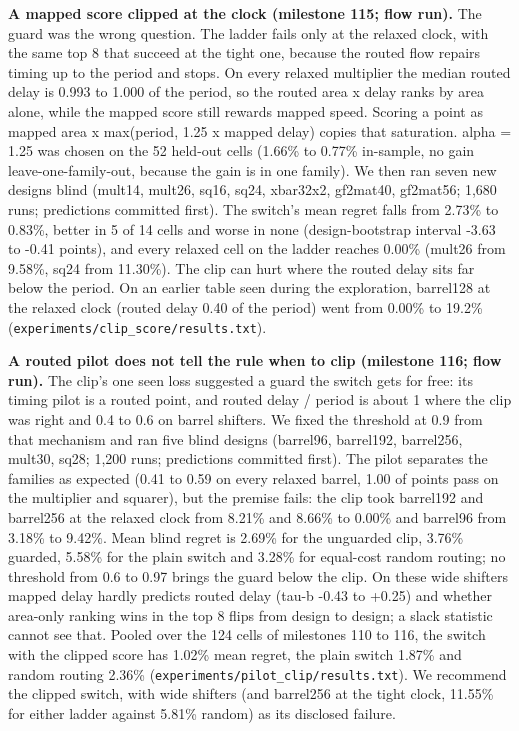 \documentclass[conference]{IEEEtran}
\begin{document}
\textbf{A mapped score clipped at the clock (milestone 115; flow run).}
The guard was the wrong question. The ladder fails only at the relaxed
clock, with the same top 8 that succeed at the tight one, because the
routed flow repairs timing up to the period and stops. On every relaxed
multiplier the median routed delay is 0.993 to 1.000 of the period, so
the routed area x delay ranks by area alone, while the mapped score
still rewards mapped speed. Scoring a point as mapped area x max(period,
1.25 x mapped delay) copies that saturation. alpha = 1.25 was chosen on
the 52 held-out cells (1.66\% to 0.77\% in-sample, no gain
leave-one-family-out, because the gain is in one family). We then ran
seven new designs blind (mult14, mult26, sq16, sq24, xbar32x2, gf2mat40,
gf2mat56; 1,680 runs; predictions committed first). The switch's mean
regret falls from 2.73\% to 0.83\%, better in 5 of 14 cells and worse in
none (design-bootstrap interval -3.63 to -0.41 points), and every
relaxed cell on the ladder reaches 0.00\% (mult26 from 9.58\%, sq24 from
11.30\%). The clip can hurt where the routed delay sits far below the
period. On an earlier table seen during the exploration, barrel128 at
the relaxed clock (routed delay 0.40 of the period) went from 0.00\% to
19.2\% (\texttt{experiments/\allowbreak{}clip\_\allowbreak{}score/\allowbreak{}results.txt}).

\textbf{A routed pilot does not tell the rule when to clip (milestone
116; flow run).} The clip's one seen loss suggested a guard the switch
gets for free: its timing pilot is a routed point, and routed delay /
period is about 1 where the clip was right and 0.4 to 0.6 on barrel
shifters. We fixed the threshold at 0.9 from that mechanism and ran five
blind designs (barrel96, barrel192, barrel256, mult30, sq28; 1,200 runs;
predictions committed first). The pilot separates the families as
expected (0.41 to 0.59 on every relaxed barrel, 1.00 of points pass on
the multiplier and squarer), but the premise fails: the clip took
barrel192 and barrel256 at the relaxed clock from 8.21\% and 8.66\% to
0.00\% and barrel96 from 3.18\% to 9.42\%. Mean blind regret is 2.69\%
for the unguarded clip, 3.76\% guarded, 5.58\% for the plain switch and
3.28\% for equal-cost random routing; no threshold from 0.6 to 0.97
brings the guard below the clip. On these wide shifters mapped delay
hardly predicts routed delay (tau-b -0.43 to +0.25) and whether
area-only ranking wins in the top 8 flips from design to design; a slack
statistic cannot see that. Pooled over the 124 cells of milestones 110
to 116, the switch with the clipped score has 1.02\% mean regret, the
plain switch 1.87\% and random routing 2.36\%
(\texttt{experiments/\allowbreak{}pilot\_\allowbreak{}clip/\allowbreak{}results.txt}). We recommend the clipped
switch, with wide shifters (and barrel256 at the tight clock, 11.55\%
for either ladder against 5.81\% random) as its disclosed failure.
\end{document}
